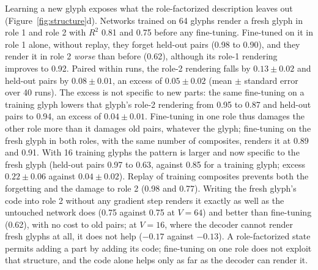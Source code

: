 \documentclass[10pt]{article}
\theoremstyle{plain}
\theoremstyle{remark}
\begin{document}
Learning a new glyph exposes what the role-factorized description leaves out (Figure~\ref{fig:structure}d). Networks trained on 64 glyphs render a fresh glyph in role 1 and role 2 with $R^2$ 0.81 and 0.75 before any fine-tuning. Fine-tuned on it in role 1 alone, without replay, they forget held-out pairs (0.98 to 0.90), and they render it in role 2 \emph{worse} than before (0.62), although its role-1 rendering improves to 0.92. Paired within runs, the role-2 rendering falls by $0.13 \pm 0.02$ and held-out pairs by $0.08 \pm 0.01$, an excess of $0.05 \pm 0.02$ (mean $\pm$ standard error over 40 runs). The excess is not specific to new parts: the same fine-tuning on a training glyph lowers that glyph's role-2 rendering from 0.95 to 0.87 and held-out pairs to 0.94, an excess of $0.04 \pm 0.01$. Fine-tuning in one role thus damages the other role more than it damages old pairs, whatever the glyph; fine-tuning on the fresh glyph in both roles, with the same number of composites, renders it at 0.89 and 0.91. With 16 training glyphs the pattern is larger and now specific to the fresh glyph (held-out pairs 0.97 to 0.63, against 0.85 for a training glyph; excess $0.22 \pm 0.06$ against $0.04 \pm 0.02$). Replay of training composites prevents both the forgetting and the damage to role 2 (0.98 and 0.77). Writing the fresh glyph's code into role 2 without any gradient step renders it exactly as well as the untouched network does (0.75 against 0.75 at $V = 64$) and better than fine-tuning (0.62), with no cost to old pairs; at $V = 16$, where the decoder cannot render fresh glyphs at all, it does not help ($-0.17$ against $-0.13$). A role-factorized state permits adding a part by adding its code; fine-tuning on one role does not exploit that structure, and the code alone helps only as far as the decoder can render it.
\end{document}
